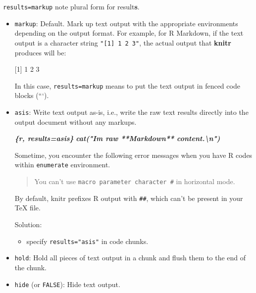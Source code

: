 \documentclass[
]{book}
\newenvironment{Shaded}{\begin{snugshade}}{\end{snugshade}}
\newcommand{\AttributeTok}[1]{\textcolor[rgb]{0.13,0.29,0.53}{#1}}
\newcommand{\InformationTok}[1]{\textcolor[rgb]{0.56,0.35,0.01}{\textbf{\textit{#1}}}}
\newcommand{\StringTok}[1]{\textcolor[rgb]{0.31,0.60,0.02}{#1}}
\providecommand{\tightlist}{%
  \setlength{\itemsep}{0pt}\setlength{\parskip}{0pt}}
\theoremstyle{definition}
\theoremstyle{definition}
\theoremstyle{definition}
\theoremstyle{definition}
\theoremstyle{remark}
\begin{document}
{\texttt{results=\textquotesingle{}markup\textquotesingle{}}} note plural form for result\textbf{s}.

\begin{itemize}
\item
  \texttt{markup}: Default. Mark up text output with the appropriate environments depending on the output format. For example, for R Markdown, if the text output is a character string \texttt{"{[}1{]}\ 1\ 2\ 3"}, the actual output that \textbf{knitr} produces will be:

\begin{Shaded}
\begin{Highlighting}[]
\StringTok{\textasciigrave{}\textasciigrave{}\textasciigrave{}}
\AttributeTok{[1] 1 2 3}
\StringTok{\textasciigrave{}\textasciigrave{}\textasciigrave{}}
\end{Highlighting}
\end{Shaded}

  In this case, \texttt{results=\textquotesingle{}markup\textquotesingle{}} means to put the text output in fenced code blocks (```).
\item
  \texttt{asis}: Write text output as-is, i.e., write the raw text results directly into the output document without any markups.

\begin{Shaded}
\begin{Highlighting}[]
\InformationTok{\textasciigrave{}\textasciigrave{}\textasciigrave{}\{r, results=\textquotesingle{}asis\textquotesingle{}\}}
\InformationTok{cat("I\textquotesingle{}m raw **Markdown** content.\textbackslash{}n")}
\InformationTok{\textasciigrave{}\textasciigrave{}\textasciigrave{}}
\end{Highlighting}
\end{Shaded}

  Sometime, you encounter the following error messages when you have R codes within \texttt{enumerate} environment.

  \begin{quote}
  You can't use \texttt{macro\ parameter\ character\ \#} in horizontal mode.
  \end{quote}

  By default, knitr prefixes R output with \texttt{\#\#}, which can't be present in your TeX file.

  Solution:

  \begin{itemize}
  \tightlist
  \item
    specify \texttt{results="asis"} in code chunks.
  \end{itemize}
\item
  \texttt{hold}: Hold all pieces of text output in a chunk and flush them to the end of the chunk.
\item
  \texttt{hide} (or \texttt{FALSE}): Hide text output.
\end{itemize}
\end{document}
